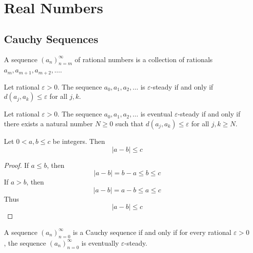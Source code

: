 \documentclass{blog}
\begin{document}
\section{Real Numbers}
\subsection{Cauchy Sequences}
\begin{definition}[sequence]
  A sequence $(a_{n})_{n = m}^{\infty}$ of rational numbers
  is a collection of rationals $a_{m}, a_{m + 1}, a_{m + 2}, \dots$.
\end{definition}

\begin{definition}
  Let rational $\varepsilon > 0$.
  The sequence $a_{0}, a_{1}, a_{2}, \dots$ is $\varepsilon$-steady
  if and only if $d(a_{j}, a_{k}) \leq \varepsilon$ for all $j, k$.
\end{definition}

\begin{definition}
  Let rational $\varepsilon > 0$.
  The sequence $a_{0}, a_{1}, a_{2}, \ldots$ is eventual $\varepsilon$-steady
  if and only if there exists a natural number $N \geq 0$ such that
  $d(a_{j}, a_{k}) \leq \varepsilon$ for all $j, k \geq N$.
\end{definition}

\begin{lemma}
  Let $0 < a, b \leq c$ be integers.
  Then
  \begin{equation*}
    |a - b| \leq c
  \end{equation*}
\end{lemma}

\begin{proof}
  If $a \leq b$, then
  \begin{equation*}
    |a - b| = b - a \leq b \leq c
  \end{equation*}
  If $a > b$, then
  \begin{equation*}
    |a - b| = a - b \leq a \leq c
  \end{equation*}
  Thus
  \begin{equation*}
    |a - b| \leq c
  \end{equation*}
\end{proof}

\begin{definition}
  \label{DEF:CAUCHY_SEQUENCE_RATIONAL}
  A sequence $(a_{n})_{n = 0}^{\infty}$ is a Cauchy sequence if and only if for every rational $\varepsilon > 0$,
  the sequence $(a_{n})_{n = 0}^{\infty}$ is eventually $\varepsilon$-steady.
\end{definition}
\end{document}
